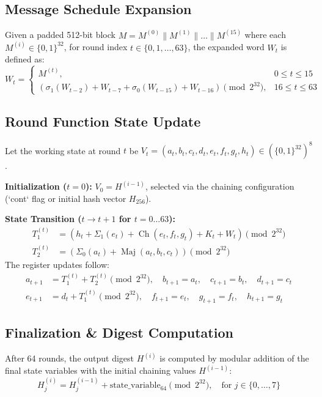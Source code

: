\documentclass[11pt, a4paper]{article}
\begin{document}
\subsection{Message Schedule Expansion}
Given a padded 512-bit block $M = M^{(0)} \parallel M^{(1)} \parallel \dots \parallel M^{(15)}$ where each $M^{(i)} \in \{0, 1\}^{32}$, for round index $t \in \{0, 1, \dots, 63\}$, the expanded word $W_t$ is defined as:
\begin{equation}
    W_t = \begin{cases} 
    M^{(t)}, & 0 \le t \le 15 \\
    \left( \sigma_1(W_{t-2}) + W_{t-7} + \sigma_0(W_{t-15}) + W_{t-16} \right) \pmod{2^{32}}, & 16 \le t \le 63 
    \end{cases}
\end{equation}

\subsection{Round Function State Update}
Let the working state at round $t$ be $V_t = (a_t, b_t, c_t, d_t, e_t, f_t, g_t, h_t) \in (\{0, 1\}^{32})^8$.

\noindent\textbf{Initialization ($t = 0$):} $V_0 = H^{(i-1)}$, selected via the chaining configuration (`cont` flag or initial hash vector $H_{256}$).

\noindent\textbf{State Transition ($t \to t+1$ for $t = 0 \dots 63$):}
\begin{align*}
    T_1^{(t)} &= \left( h_t + \Sigma_1(e_t) + \operatorname{Ch}(e_t, f_t, g_t) + K_t + W_t \right) \pmod{2^{32}} \\
    T_2^{(t)} &= \left( \Sigma_0(a_t) + \operatorname{Maj}(a_t, b_t, c_t) \right) \pmod{2^{32}}
\end{align*}
The register updates follow:
\begin{align*}
    a_{t+1} &= T_1^{(t)} + T_2^{(t)} \pmod{2^{32}}, \quad b_{t+1} = a_t, \quad c_{t+1} = b_t, \quad d_{t+1} = c_t \\
    e_{t+1} &= d_t + T_1^{(t)} \pmod{2^{32}}, \quad f_{t+1} = e_t, \quad g_{t+1} = f_t, \quad h_{t+1} = g_t
\end{align*}

\subsection{Finalization \& Digest Computation}
After 64 rounds, the output digest $H^{(i)}$ is computed by modular addition of the final state variables with the initial chaining values $H^{(i-1)}$:
\begin{equation}
    H_j^{(i)} = H_j^{(i-1)} + \text{state\_variable}_{64} \pmod{2^{32}}, \quad \text{for } j \in \{0, \dots, 7\}
\end{equation}
\end{document}
